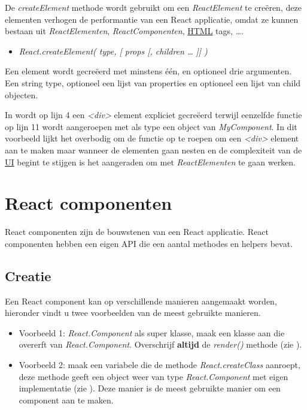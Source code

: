 		De \emph{createElement} methode wordt gebruikt om een \emph{ReactElement} te creëren, deze elementen verhogen de performantie van een React applicatie, omdat ze kunnen bestaan uit \emph{ReactElementen}, \emph{ReactComponenten}, \hyperref[html]{HTML} tags, \ldots.
		
		\begin{itemize}
			\item[] \emph{React.createElement( type, [ props [, children … ]] )}
		\end{itemize}
		
		Een element wordt gecreëerd met minstens één, en optioneel drie argumenten. Een string type, optioneel een lijst van properties en optioneel een lijst van child objecten.
		
		
		In  wordt op lijn 4 een \emph{<div>} element expliciet gecreëerd terwijl eenzelfde functie op lijn 11 wordt aangeroepen met als type een object van \emph{MyComponent}. In dit voorbeeld lijkt het overbodig om de functie op te roepen om een \emph{<div>} element aan te maken maar wanneer de elementen gaan nesten en de complexiteit van de \hyperref[ui]{UI} begint te stijgen is het aangeraden om met \emph{ReactElementen} te gaan werken.
	
\section{React componenten}
	
	React componenten zijn de bouwstenen van een React applicatie. React componenten hebben een eigen API die een aantal methodes en helpers bevat.
	
	\subsection{Creatie}
		
		Een React component kan op verschillende manieren aangemaakt worden, hieronder vindt u twee voorbeelden van de meest gebruikte manieren.
		
		\begin{itemize}
			\item Voorbeeld 1: \emph{React.Component} als super klasse, maak een klasse aan die overerft van \emph{React.Component}. Overschrijf \textbf{altijd} de \emph{render()} methode (zie ).
			\item Voorbeeld 2: maak een variabele die de methode \emph{React.createClass} aanroept, deze methode geeft een object weer van type \emph{React.Component} met eigen implementatie (zie ). Deze manier is de meest gebruikte manier om een component aan te maken.
		\end{itemize}
	
